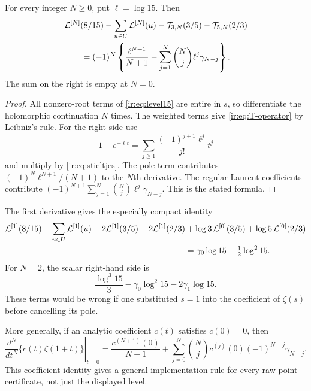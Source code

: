 \begin{theorem}
\label{ir:thm:jets15}
For every integer $N\ge0$, put $\ell=\log15$. Then
\begin{align}
 &\mathcal L^{[N]}(8/15)-\sum_{u\in U}\mathcal L^{[N]}(u)
 -\mathcal T_{3,N}(3/5)-\mathcal T_{5,N}(2/3)\nonumber\\
 &\qquad =(-1)^N\left\{\frac{\ell^{N+1}}{N+1}
 -\sum_{j=1}^{N}\binom Nj\ell^j\gamma_{N-j}\right\}.
 \label{ir:eq:jets15}
\end{align}
The sum on the right is empty at $N=0$.
\end{theorem}
\begin{proof}
All nonzero-root terms of \eqref{ir:eq:level15} are entire in $s$,
so differentiate the holomorphic continuation $N$ times. The weighted
terms give \eqref{ir:eq:T-operator} by Leibniz's rule. For the right
side use
\[
 1-e^{-\ell t}=\sum_{j\ge1}\frac{(-1)^{j+1}\ell^j}{j!}t^j
\]
and multiply by \eqref{ir:eq:stieltjes}. The pole term contributes
$(-1)^N\ell^{N+1}/(N+1)$ to the $N$th derivative. The regular
Laurent coefficients contribute
$(-1)^{N+1}\sum_{j=1}^N\binom Nj\ell^j\gamma_{N-j}$.
This is the stated formula.
\end{proof}

The first derivative gives the especially compact identity
\begin{align}
 \mathcal L^{[1]}(8/15)-\sum_{u\in U}\mathcal L^{[1]}(u)
 -2\mathcal L^{[1]}(3/5)-2\mathcal L^{[1]}(2/3)
 &+\log3\,\mathcal L^{[0]}(3/5)+\log5\,\mathcal L^{[0]}(2/3)\nonumber\\
 &=\gamma_0\log15-\tfrac12\log^2 15.
 \label{ir:eq:first-jet}
\end{align}
For $N=2$, the scalar right-hand side is
\[
 \frac{\log^3 15}{3}-\gamma_0\log^2 15-2\gamma_1\log15.
\]
These terms would be wrong if one substituted $s=1$ into the
coefficient of $\zeta(s)$ before cancelling its pole.

More generally, if an analytic coefficient $c(t)$ satisfies $c(0)=0$,
then
\begin{equation}\label{ir:eq:general-pole-jet}
 \left.\frac{d^N}{dt^N}\{c(t)\zeta(1+t)\}\right|_{t=0}
 =\frac{c^{(N+1)}(0)}{N+1}
 +\sum_{j=0}^{N}\binom Nj c^{(j)}(0)(-1)^{N-j}\gamma_{N-j}.
\end{equation}
This coefficient identity gives a general implementation rule for every
raw-point certificate, not just the displayed level.


